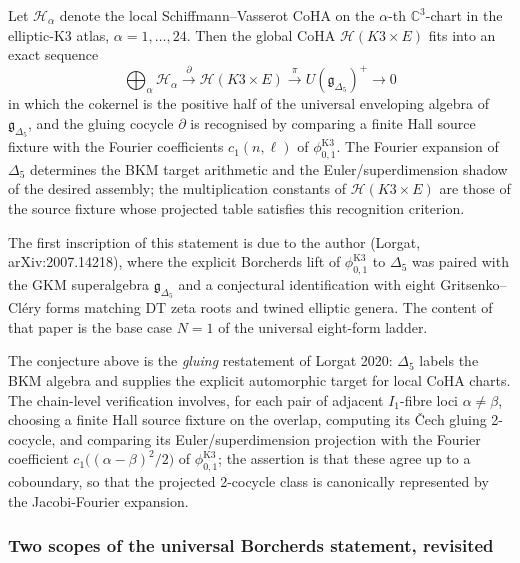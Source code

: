 \begin{conjecture}
\label{conj:automorphic-assembly-k3xe}
\ClaimStatusConjectured
Let $\mathcal H_\alpha$ denote the local Schiffmann--Vasserot CoHA on the $\alpha$-th $\mathbb C^3$-chart in the elliptic-K3 atlas, $\alpha = 1, \ldots, 24$. Then the global CoHA $\mathcal H(K3 \times E)$ fits into an exact sequence
\[
 \bigoplus_\alpha \mathcal H_\alpha \xrightarrow{\;\partial\;} \mathcal H(K3 \times E) \xrightarrow{\;\pi\;} U(\mathfrak g_{\Delta_5})^+ \longrightarrow 0
\]
in which the cokernel is the positive half of the universal enveloping algebra of $\mathfrak g_{\Delta_5}$, and the gluing cocycle $\partial$ is recognised by comparing a finite Hall source fixture with the Fourier coefficients $c_1(n, \ell)$ of $\phi_{0, 1}^{\mathrm{K3}}$. The Fourier expansion of $\Delta_5$ determines the BKM target arithmetic and the Euler/superdimension shadow of the desired assembly; the multiplication constants of $\mathcal H(K3 \times E)$ are those of the source fixture whose projected table satisfies this recognition criterion.
\end{conjecture}

The first inscription of this statement is due to the author (Lorgat, arXiv:2007.14218), where the explicit Borcherds lift of $\phi_{0, 1}^{\mathrm{K3}}$ to $\Delta_5$ was paired with the GKM superalgebra $\mathfrak g_{\Delta_5}$ and a conjectural identification with eight Gritsenko--Cl\'ery forms matching DT zeta roots and twined elliptic genera. The content of that paper is the base case $N = 1$ of the universal eight-form ladder.

The conjecture above is the \emph{gluing} restatement of Lorgat 2020: $\Delta_5$ labels the BKM algebra and supplies the explicit automorphic target for local CoHA charts. The chain-level verification involves, for each pair of adjacent $I_1$-fibre loci $\alpha \neq \beta$, choosing a finite Hall source fixture on the overlap, computing its Čech gluing 2-cocycle, and comparing its Euler/superdimension projection with the Fourier coefficient $c_1\bigl((\alpha - \beta)^2/2\bigr)$ of $\phi_{0, 1}^{\mathrm{K3}}$; the assertion is that these agree up to a coboundary, so that the projected 2-cocycle class is canonically represented by the Jacobi-Fourier expansion.

\subsubsection{Two scopes of the universal Borcherds statement, revisited}

